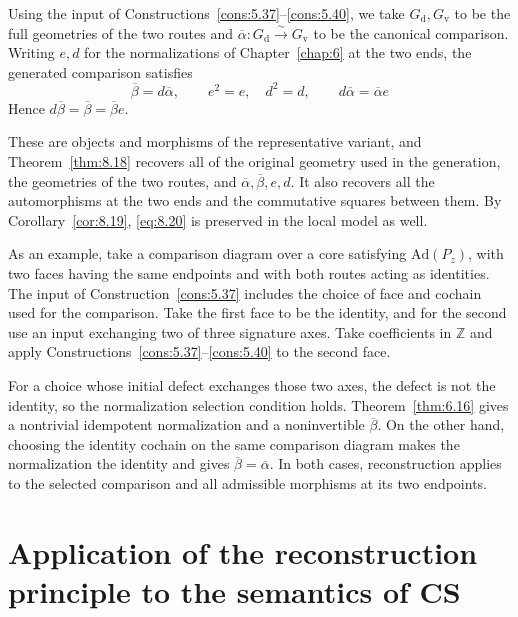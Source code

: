 \begin{example}\label{ex:8.21}

Using the input of Constructions~\ref{cons:5.37}--\ref{cons:5.40},
we take $G_{\mathrm d},G_{\mathrm v}$ to be the full geometries of the two routes and
$\overline\alpha:G_{\mathrm d}\xrightarrow{\sim}G_{\mathrm v}$ to be the canonical
comparison.
Writing $e,d$ for the normalizations of Chapter~\ref{chap:6} at the two ends, the generated
comparison satisfies
\begin{equation*}
\overline\beta=d\overline\alpha,\qquad
e^2=e,\quad d^2=d,\qquad
d\overline\alpha=\overline\alpha e
\tag{8.20}\label{eq:8.20}
\end{equation*}
Hence $d\overline\beta=\overline\beta=\overline\beta e$.

These are objects and morphisms of the representative variant, and Theorem~\ref{thm:8.18}
recovers all of the original geometry used in the generation, the geometries of the two
routes, and $\overline\alpha,\overline\beta,e,d$.
It also recovers all the automorphisms at the two ends and the commutative squares between
them.
By Corollary~\ref{cor:8.19}, \eqref{eq:8.20} is preserved in the local model as well.

As an example, take a comparison diagram over a core satisfying $\mathrm{Ad}(P_z)$,
with two faces having the same endpoints and with both routes acting as identities.
The input of Construction~\ref{cons:5.37} includes the choice of face and cochain
used for the comparison. Take the first face to be the identity, and for the second
use an input exchanging two of three signature axes.
Take coefficients in $\mathbb{Z}$ and apply Constructions~\ref{cons:5.37}--\ref{cons:5.40}
to the second face.

For a choice whose initial defect exchanges those two axes, the defect is not the
identity, so the normalization selection condition holds.
Theorem~\ref{thm:6.16} gives a nontrivial idempotent normalization and a noninvertible
$\overline\beta$. On the other hand, choosing the identity cochain on the same
comparison diagram makes the normalization the identity and gives
$\overline\beta=\overline\alpha$.
In both cases, reconstruction applies to the selected comparison and all admissible
morphisms at its two endpoints.

\end{example}

\section{Application of the reconstruction principle to the semantics of CS}\label{sec:8.7}

